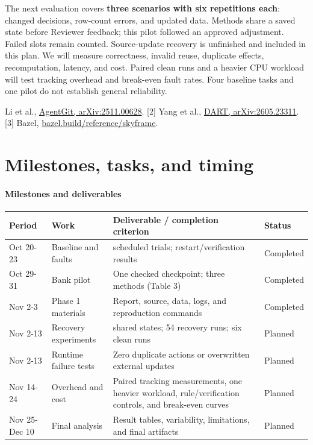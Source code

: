 \documentclass{article}
\renewcommand{\footnotesize}{\fontsize{9}{10}\selectfont}
\begin{document}
The next evaluation covers \textbf{three scenarios with six repetitions each}: changed decisions, row-count errors, and updated data. Methods share a saved state before Reviewer feedback; this pilot followed an approved adjustment. Failed slots remain counted. Source-update recovery is unfinished and included in this plan. We will measure correctness, invalid reuse, duplicate effects, recomputation, latency, and cost. Paired clean runs and a heavier CPU workload will test tracking overhead and break-even fault rates. Four baseline tasks and one pilot do not establish general reliability.

{\footnotesize [1] Li et al., \href{https://arxiv.org/abs/2511.00628}{AgentGit, arXiv:2511.00628}. [2] Yang et al., \href{https://arxiv.org/abs/2605.23311}{DART, arXiv:2605.23311}. [3] Bazel, \href{https://bazel.build/reference/skyframe}{bazel.build/reference/skyframe}.\par}

\clearpage
\appendix
\section{Milestones, tasks, and timing}
\begingroup
\normalsize
\setlength{\parskip}{3pt}
\paragraph{Milestones and deliverables}
\begin{center}
\footnotesize
\setlength{\tabcolsep}{3pt}
\renewcommand{\arraystretch}{1.10}
\begin{tabular}{@{}>{\raggedright\arraybackslash}p{.12\linewidth}>{\raggedright\arraybackslash}p{.19\linewidth}>{\raggedright\arraybackslash}p{.51\linewidth}>{\raggedright\arraybackslash}p{.12\linewidth}@{}}
\toprule
\textbf{Period} & \textbf{Work} & \textbf{Deliverable / completion criterion} & \textbf{Status} \\
\midrule
Oct 20-23 & Baseline and faults & 168 scheduled trials; restart/verification results & Completed \\
Oct 29-31 & Bank pilot & One checked checkpoint; three methods (Table 3) & Completed \\
Nov 2-3 & Phase 1 materials & Report, source, data, logs, and reproduction commands & Completed \\
Nov 2-13 & Recovery experiments & 18 shared states; 54 recovery runs; six clean runs & Planned \\
Nov 2-13 & Runtime failure tests & Zero duplicate actions or overwritten external updates & Planned \\
Nov 14-24 & Overhead and cost & Paired tracking measurements, one heavier workload, rule/verification controls, and break-even curves & Planned \\
Nov 25-Dec 10 & Final analysis & Result tables, variability, limitations, and final artifacts & Planned \\
\bottomrule
\end{tabular}
\end{center}
\end{document}
